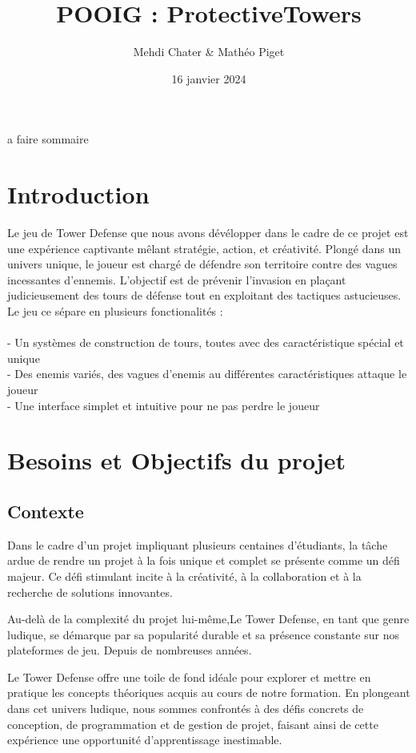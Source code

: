 \documentclass{article}
\title{POOIG : ProtectiveTowers}
\author{Mehdi Chater \& Mathéo Piget}
\date{16 janvier 2024}
\begin{document}
\maketitle

a faire sommaire 

\section{Introduction}
Le jeu de Tower Defense que nous avons dévélopper dans le cadre de ce projet est une expérience captivante mêlant stratégie, action, et créativité. Plongé dans un univers unique, le joueur est chargé de défendre son territoire contre des vagues incessantes d'ennemis. L'objectif est de prévenir l'invasion en plaçant judicieusement des tours de défense tout en exploitant des tactiques astucieuses. Le jeu ce sépare en plusieurs fonctionalités : \\
\\
- Un systèmes de construction de tours, toutes avec des caractéristique spécial et unique \\
- Des enemis variés, des vagues d'enemis au différentes caractéristiques attaque le joueur\\
- Une interface simplet et intuitive pour ne pas perdre le joueur

\section{Besoins et Objectifs du projet}

\subsection{Contexte}

Dans le cadre d'un projet impliquant plusieurs centaines d'étudiants, la tâche ardue de rendre un projet à la fois unique et complet se présente comme un défi majeur. Ce défi stimulant incite à la créativité, à la collaboration et à la recherche de solutions innovantes.

Au-delà de la complexité du projet lui-même,Le Tower Defense, en tant que genre ludique, se démarque par sa popularité durable et sa présence constante sur nos plateformes de jeu. Depuis de nombreuses années.

Le Tower Defense offre une toile de fond idéale pour explorer et mettre en pratique les concepts théoriques acquis au cours de notre formation. En plongeant dans cet univers ludique, nous sommes confrontés à des défis concrets de conception, de programmation et de gestion de projet, faisant ainsi de cette expérience une opportunité d'apprentissage inestimable.
\end{document}

